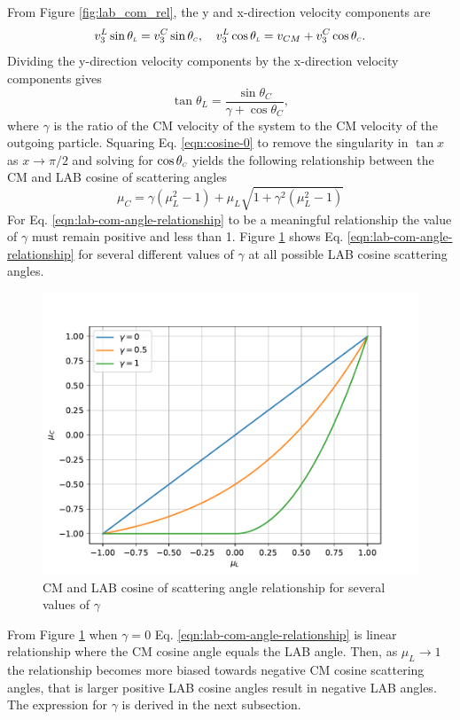 \documentclass[../main.tex]{subfiles}
\begin{document}
From Figure \ref{fig:lab_com_rel}, the y and x-direction velocity components are
\begin{equation}
  v_{3}^L \sin \theta_{\scaleto{L}{3pt}} = v_{3}^C \sin \theta_{\scaleto{C}{3pt}}, \quad v_{3}^L \cos \theta_{\scaleto{L}{3pt}} = v_{CM} + v_{3}^C \cos \theta_{\scaleto{C}{3pt}}.
\end{equation}
Dividing the y-direction velocity components by the x-direction velocity components gives
\begin{equation} \label{eqn:cosine-0}
  \tan \theta_L = \dfrac{\sin \theta_C}{\gamma + \cos \theta_C},
\end{equation}
where $\gamma$ is the ratio of the CM velocity of the system to the CM velocity of the outgoing particle. Squaring Eq. \eqref{eqn:cosine-0} to remove the singularity in $\tan x$ as $x \rightarrow \pi/2$ and solving for $\cos \theta_{\scaleto{C}{3pt}}$ yields the following relationship between the CM and LAB cosine of scattering angles
\begin{equation} \label{eqn:lab-com-angle-relationship}
  \mu_C = \gamma (\mu_L^2 - 1) + \mu_L \sqrt{1 + \gamma^2(\mu_L^2-1)}
\end{equation}
For Eq. \eqref{eqn:lab-com-angle-relationship} to be a meaningful relationship the value of $\gamma$ must remain positive and less than 1. Figure \ref{fig:cm-lab-cosine-relationship} shows Eq. \eqref{eqn:lab-com-angle-relationship} for several different values of $\gamma$ at all possible LAB cosine scattering angles. 
\begin{figure}[!htb]
  \centering
  \includegraphics[scale=0.75]{../figures/particle_kinematics/cm_lab_angle_relationship.pdf}
  \caption{CM and LAB cosine of scattering angle relationship for several values of $\gamma$}
  \label{fig:cm-lab-cosine-relationship}
\end{figure}
From Figure \ref{fig:cm-lab-cosine-relationship} when $\gamma = 0$ Eq. \eqref{eqn:lab-com-angle-relationship} is linear relationship where the CM cosine angle equals the LAB angle. Then, as $\mu_L \rightarrow 1$ the relationship becomes more biased towards negative CM cosine scattering angles, that is larger positive LAB cosine angles result in negative LAB angles. The expression for $\gamma$ is derived in the next subsection.
\end{document}

